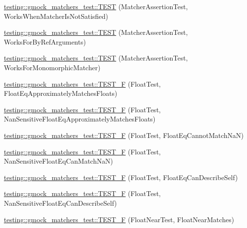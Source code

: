 \begin{DoxyCompactItemize}
\item 
\mbox{\hyperlink{namespacetesting_1_1gmock__matchers__test_a2f3755be7052d6e7769e3323053399d0}{testing\+::gmock\+\_\+matchers\+\_\+test\+::\+T\+E\+ST}} (Matcher\+Assertion\+Test, Works\+When\+Matcher\+Is\+Not\+Satisfied)
\item 
\mbox{\hyperlink{namespacetesting_1_1gmock__matchers__test_afcf1287c7fd759157367026613ddd727}{testing\+::gmock\+\_\+matchers\+\_\+test\+::\+T\+E\+ST}} (Matcher\+Assertion\+Test, Works\+For\+By\+Ref\+Arguments)
\item 
\mbox{\hyperlink{namespacetesting_1_1gmock__matchers__test_a0fe4bde05f667c4877e3b4a4a7bde002}{testing\+::gmock\+\_\+matchers\+\_\+test\+::\+T\+E\+ST}} (Matcher\+Assertion\+Test, Works\+For\+Monomorphic\+Matcher)
\item 
\mbox{\hyperlink{namespacetesting_1_1gmock__matchers__test_a69257e935b4334c835b3ad26acea9104}{testing\+::gmock\+\_\+matchers\+\_\+test\+::\+T\+E\+S\+T\+\_\+F}} (Float\+Test, Float\+Eq\+Approximately\+Matches\+Floats)
\item 
\mbox{\hyperlink{namespacetesting_1_1gmock__matchers__test_abb691880cd22f6f444c978547b13f792}{testing\+::gmock\+\_\+matchers\+\_\+test\+::\+T\+E\+S\+T\+\_\+F}} (Float\+Test, Nan\+Sensitive\+Float\+Eq\+Approximately\+Matches\+Floats)
\item 
\mbox{\hyperlink{namespacetesting_1_1gmock__matchers__test_a111f0c8a5ec17b47e8eb6226e1c2cb58}{testing\+::gmock\+\_\+matchers\+\_\+test\+::\+T\+E\+S\+T\+\_\+F}} (Float\+Test, Float\+Eq\+Cannot\+Match\+NaN)
\item 
\mbox{\hyperlink{namespacetesting_1_1gmock__matchers__test_a4e9d89902e088a10915b4f9463ac0f09}{testing\+::gmock\+\_\+matchers\+\_\+test\+::\+T\+E\+S\+T\+\_\+F}} (Float\+Test, Nan\+Sensitive\+Float\+Eq\+Can\+Match\+NaN)
\item 
\mbox{\hyperlink{namespacetesting_1_1gmock__matchers__test_a264de01a5019e5c358116845bf5edd14}{testing\+::gmock\+\_\+matchers\+\_\+test\+::\+T\+E\+S\+T\+\_\+F}} (Float\+Test, Float\+Eq\+Can\+Describe\+Self)
\item 
\mbox{\hyperlink{namespacetesting_1_1gmock__matchers__test_a95a2bbc273ff70fc364c5c9c4697834c}{testing\+::gmock\+\_\+matchers\+\_\+test\+::\+T\+E\+S\+T\+\_\+F}} (Float\+Test, Nan\+Sensitive\+Float\+Eq\+Can\+Describe\+Self)
\item 
\mbox{\hyperlink{namespacetesting_1_1gmock__matchers__test_a6897409da5003f20f891d8a5ecabdc99}{testing\+::gmock\+\_\+matchers\+\_\+test\+::\+T\+E\+S\+T\+\_\+F}} (Float\+Near\+Test, Float\+Near\+Matches)

\end{DoxyCompactItemize}
